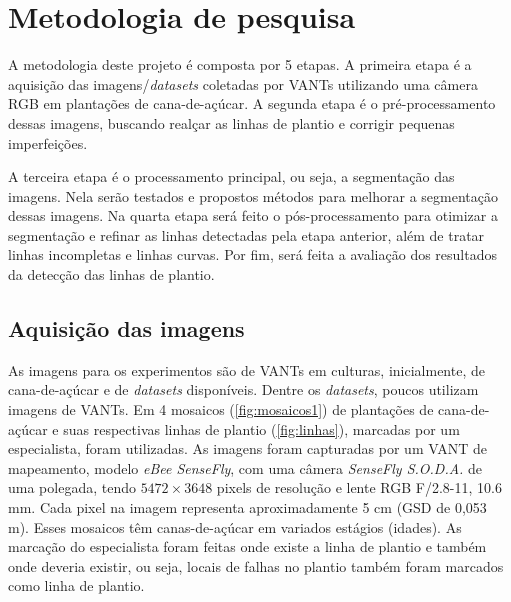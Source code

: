 \documentclass[12pt, a4paper, english, brazil]{article}
\begin{document}
\section{Metodologia de pesquisa}

A metodologia deste projeto é composta por 5 etapas. A primeira etapa é a aquisição das imagens/\textit{datasets} coletadas por VANTs utilizando uma câmera RGB em plantações de cana-de-açúcar. A segunda etapa é o pré-processamento dessas imagens, buscando realçar as linhas de plantio e corrigir pequenas imperfeições.

A terceira etapa é o processamento principal, ou seja, a segmentação das imagens. Nela serão testados e propostos métodos para melhorar a segmentação dessas imagens. Na quarta etapa será feito o pós-processamento para otimizar a segmentação e refinar as linhas detectadas pela etapa anterior, além de tratar linhas incompletas e linhas curvas. Por fim, será feita a avaliação dos resultados da detecção das linhas de plantio.

\subsection{Aquisição das imagens}

As imagens para os experimentos são de VANTs em culturas, inicialmente, de cana-de-açúcar e de \textit{datasets} disponíveis. Dentre os \textit{datasets}, poucos utilizam imagens de VANTs. Em  4 mosaicos (\autoref{fig:mosaicos1}) de plantações de cana-de-açúcar e suas respectivas linhas de plantio (\autoref{fig:linhas}), marcadas por um especialista, foram utilizadas. As imagens foram capturadas por um VANT de mapeamento, modelo \textit{eBee SenseFly}, com uma câmera \textit{SenseFly S.O.D.A.} de uma polegada, tendo $5472\times3648$ pixels de resolução e lente RGB F/2.8-11, 10.6 mm. Cada pixel na imagem representa aproximadamente 5 cm (GSD de 0,053 m). Esses mosaicos têm canas-de-açúcar em variados estágios (idades). As marcação do especialista foram feitas onde existe a linha de plantio e também onde deveria existir, ou seja, locais de falhas no plantio também foram marcados como linha de plantio.
\end{document}
